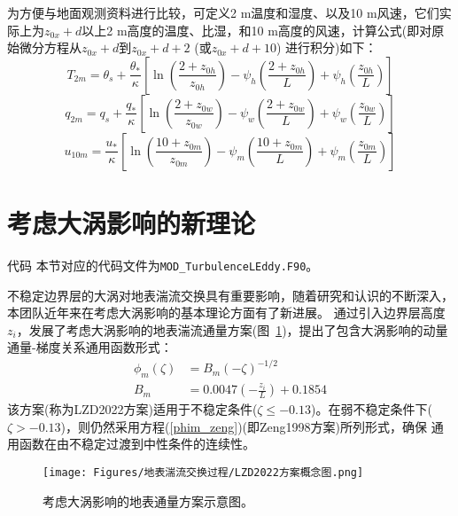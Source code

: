 为方便与地面观测资料进行比较，可定义2 m温度和湿度、以及10 m风速，它们实际上为$z_{0x}+d$以上2 m高度的温度、比湿，和10 m高度的风速，计算公式(即对原始微分方程从$z_{0x}+d$到$z_{0x}+d+2$ (或$z_{0x}+d+10$) 进行积分)如下：
\begin{equation}\label{T2m}
T_{2 m}=\theta_{s}+\frac{\theta_{*}}{\kappa}\left[\ln \left(\frac{2+z_{0 h}}{z_{0 h}}\right)-\psi_{h}\left(\frac{2+z_{0 h}}{L}\right)+\psi_{h}\left(\frac{z_{0 h}}{L}\right)\right]
\end{equation}
\begin{equation}\label{q2m}
q_{2 m}=q_{s}+\frac{q_{*}}{\kappa}\left[\ln \left(\frac{2+z_{0 w}}{z_{0 w}}\right)-\psi_{w}\left(\frac{2+z_{0 w}}{L}\right)+\psi_{w}\left(\frac{z_{0 w}}{L}\right)\right]
\end{equation}
\begin{equation}
u_{10 m}=\frac{u_{*}}{\kappa}\left[\ln \left(\frac{10+z_{0 m}}{z_{0 m}}\right)-\psi_{m}\left(\frac{10+z_{0 m}}{L}\right)+\psi_{m}\left(\frac{z_{0 m}}{L}\right)\right]
\end{equation}


\section{考虑大涡影响的新理论}\label{考虑大涡影响的新理论}
\begin{mymdframed}{代码}
本节对应的代码文件为\texttt{MOD\_TurbulenceLEddy.F90}。
\end{mymdframed}

不稳定边界层的大涡对地表湍流交换具有重要影响，随着研究和认识的不断深入，本团队近年来在考虑大涡影响的基本理论方面有了新进展。\citet{liu2019further,liu2022surface}
通过引入边界层高度$z_i$，发展了考虑大涡影响的地表湍流通量方案(图~\ref{fig:LZD2022方案概念图})，提出了包含大涡影响的动量通量-梯度关系通用函数形式：
\begin{equation}
  \begin{aligned}
     \phi_{m}(\zeta) &= B_{m} (-\zeta)^{-1/2} \\
     B_{m} &= 0.0047(-\frac{z_{i}}{L})+0.1854
  \end{aligned}
\end{equation}
该方案(称为LZD2022方案)适用于不稳定条件($\zeta \leq -0.13$)。在弱不稳定条件下($\zeta > -0.13$)，则仍然采用方程(\ref{phim_zeng})(即Zeng1998方案)所列形式，确保
通用函数在由不稳定过渡到中性条件的连续性。
{
\begin{figure}[]
\centering
\texttt{[image: Figures/地表湍流交换过程/LZD2022方案概念图.png]}
\caption{考虑大涡影响的地表通量方案示意图。}
\label{fig:LZD2022方案概念图}
\end{figure}
}

